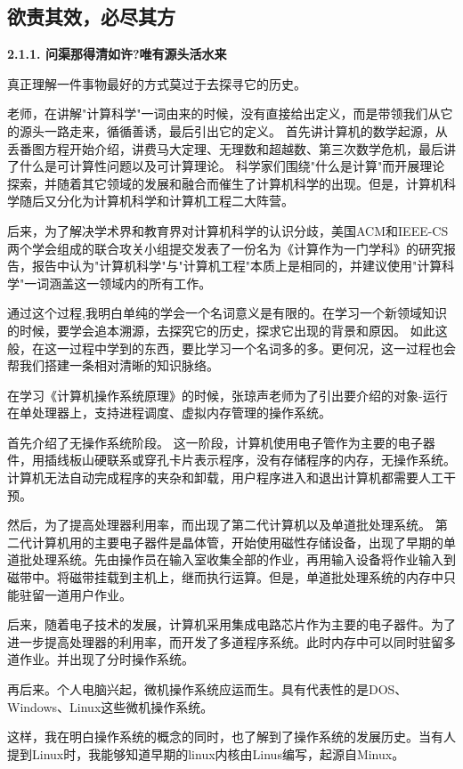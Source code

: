 \documentclass{article}
\begin{document}
\subsection{欲责其效，必尽其方}
\textbf{2.1.1. 问渠那得清如许?唯有源头活水来}\par
真正理解一件事物最好的方式莫过于去探寻它的历史。\par
老师，在讲解"计算科学"一词由来的时候，没有直接给出定义，而是带领我们从它的源头一路走来，循循善诱，最后引出它的定义。
首先讲计算机的数学起源，从丢番图方程开始介绍，讲费马大定理、无理数和超越数、第三次数学危机，最后讲了什么是可计算性问题以及可计算理论。
科学家们围绕"什么是计算"而开展理论探索，并随着其它领域的发展和融合而催生了计算机科学的出现。但是，计算机科学随后又分化为计算机科学和计算机工程二大阵营。\par
后来，为了解决学术界和教育界对计算机科学的认识分歧，美国ACM和IEEE-CS两个学会组成的联合攻关小组提交发表了一份名为《计算作为一门学科》的研究报告，报告中认为"计算机科学"与"计算机工程"本质上是相同的，并建议使用"计算科学"一词涵盖这一领域内的所有工作。\par
通过这个过程,我明白单纯的学会一个名词意义是有限的。在学习一个新领域知识的时候，要学会追本溯源，去探究它的历史，探求它出现的背景和原因。
如此这般，在这一过程中学到的东西，要比学习一个名词多的多。更何况，这一过程也会帮我们搭建一条相对清晰的知识脉络。\par
在学习《计算机操作系统原理》的时候，张琼声老师为了引出要介绍的对象-运行在单处理器上，支持进程调度、虚拟内存管理的操作系统。\par
首先介绍了无操作系统阶段。
这一阶段，计算机使用电子管作为主要的电子器件，用插线板山硬联系或穿孔卡片表示程序，没有存储程序的内存，无操作系统。计算机无法自动完成程序的夹杂和卸载，用户程序进入和退出计算机都需要人工干预。\par
然后，为了提高处理器利用率，而出现了第二代计算机以及单道批处理系统。
第二代计算机用的主要电子器件是晶体管，开始使用磁性存储设备，出现了早期的单道批处理系统。先由操作员在输入室收集全部的作业，再用输入设备将作业输入到磁带中。将磁带挂载到主机上，继而执行运算。但是，单道批处理系统的内存中只能驻留一道用户作业。\par
后来，随着电子技术的发展，计算机采用集成电路芯片作为主要的电子器件。为了进一步提高处理器的利用率，而开发了多道程序系统。此时内存中可以同时驻留多道作业。并出现了分时操作系统。\par
再后来。个人电脑兴起，微机操作系统应运而生。具有代表性的是DOS、Windows、Linux这些微机操作系统。\par
这样，我在明白操作系统的概念的同时，也了解到了操作系统的发展历史。当有人提到Linux时，我能够知道早期的linux内核由Linus编写，起源自Minux。\par
\end{document}
